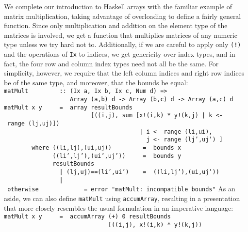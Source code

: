 We complete our introduction to Haskell arrays with the familiar
example of matrix multiplication, taking advantage of overloading
to define a fairly general function.  Since only multiplication and
addition on the element type of the matrices is involved, we get
a function that multiplies matrices of any numeric type unless we
try hard not to.  Additionally, if we are careful to apply only
\mbox{\tt (!)} and the operations of \mbox{\tt Ix} to indices, we get genericity over
index types, and in fact, the four row and column index types need
not all be the same.  For simplicity, however, we require that
the left column indices and right row indices be of the same type, and
moreover, that the bounds be equal:
\bprog
\mbox{\tt matMult\ \ \ \ \ \ \ \ \ ::\ (Ix\ a,\ Ix\ b,\ Ix\ c,\ Num\ d)\ =>}\\
\mbox{\tt \ \ \ \ \ \ \ \ \ \ \ \ \ \ \ \ \ \ \ Array\ (a,b)\ d\ ->\ Array\ (b,c)\ d\ ->\ Array\ (a,c)\ d}\\
\mbox{\tt matMult\ x\ y\ \ \ \ \ =\ \ array\ resultBounds}\\
\mbox{\tt \ \ \ \ \ \ \ \ \ \ \ \ \ \ \ \ \ \ \ \ \ \ \ \ \ [((i,j),\ sum\ [x!(i,k)\ *\ y!(k,j)\ |\ k\ <-\ range\ (lj,uj)])}\\
\mbox{\tt \ \ \ \ \ \ \ \ \ \ \ \ \ \ \ \ \ \ \ \ \ \ \ \ \ \ \ \ \ \ \ \ \ \ \ \ \ \ \ |\ i\ <-\ range\ (li,ui),}\\
\mbox{\tt \ \ \ \ \ \ \ \ \ \ \ \ \ \ \ \ \ \ \ \ \ \ \ \ \ \ \ \ \ \ \ \ \ \ \ \ \ \ \ \ \ j\ <-\ range\ (lj',uj')\ ]}\\
\mbox{\tt \ \ \ \ \ \ \ \ where\ ((li,lj),(ui,uj))\ \ \ \ \ \ \ \ \ =\ \ bounds\ x}\\
\mbox{\tt \ \ \ \ \ \ \ \ \ \ \ \ \ \ ((li',lj'),(ui',uj'))\ \ \ \ \ =\ \ bounds\ y}\\
\mbox{\tt \ \ \ \ \ \ \ \ \ \ \ \ \ \ resultBounds}\\
\mbox{\tt \ \ \ \ \ \ \ \ \ \ \ \ \ \ \ \ |\ (lj,uj)==(li',ui')\ \ \ \ =\ \ ((li,lj'),(ui,uj'))}\\
\mbox{\tt \ \ \ \ \ \ \ \ \ \ \ \ \ \ \ \ |\ otherwise\ \ \ \ \ \ \ \ \ \ \ \ \ =\ error\ "matMult:\ incompatible\ bounds"}
\eprog
As an aside, we can also define \mbox{\tt matMult} using \mbox{\tt accumArray},
resulting in a presentation that more closely resembles the
usual formulation in an imperative language:
\bprog
\mbox{\tt matMult\ x\ y\ \ \ \ \ =\ \ accumArray\ (+)\ 0\ resultBounds}\\
\mbox{\tt \ \ \ \ \ \ \ \ \ \ \ \ \ \ \ \ \ \ \ \ \ \ \ \ \ \ \ \ \ \ [((i,j),\ x!(i,k)\ *\ y!(k,j))}\\
